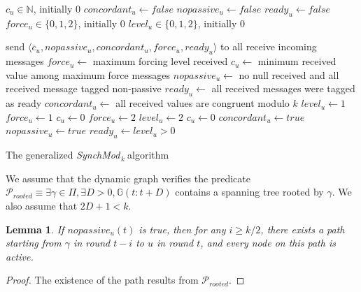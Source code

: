 \documentclass[11pt,letterpaper]{article}
\renewcommand{\geq}{\geqslant}
\newtheorem{lem}[thm]{Lemma}
\newcommand{\cent}{\gamma}
\newcommand{\SM}{{\em SynchMod}$_{\,k}\ $}
\begin{document}
\begin{algorithm}[htb]\label{algo:code}
\begin{distribalgo}[1]
\BLANK {}
	\STATE $c_u \in \mathds{N}$, initially 0
	\STATE $concordant_u \leftarrow false$
	\STATE $nopassive_u \leftarrow false$
	\STATE $ready_u \leftarrow false$
	\STATE $force_u \in \{0, 1, 2\}$, initially 0
	\STATE $level_u \in \{0, 1, 2\}$, initially 0

\ENDINDENT \BLANK

	\STATE send $\langle \overline{c}_u, nopassive_u, concordant_u, force_u, ready_u \rangle$ to all 
	\STATE receive incoming messages
	\STATE $force_u \leftarrow$ maximum forcing level received \label{line:force}
	\STATE $c_u \leftarrow$ minimum received value among maximum force messages \label{line:min-z-end}
	\STATE $nopassive_u \leftarrow$ no null received and all received message tagged non-passive
	\STATE $ready_u \leftarrow$ all received messages were tagged as ready
	\STATE $concordant_u \leftarrow$ all received values are congruent modulo $k$ \label{line:conc-gossip}
			\STATE $level_u \leftarrow 1$
			\STATE $force_u \leftarrow 1$ \label{line:force2}
			\STATE $c_u \leftarrow 0$
		\ENDIF
			\STATE $force_u \leftarrow 2$
			\STATE $level_u \leftarrow 2$
			\STATE $c_u \leftarrow 0$
		\ENDIF
		\STATE $concordant_u \leftarrow true$ \label{line:conc-true}
		\STATE $nopassive_u \leftarrow true$ \label{line:nopassive-true}
		\STATE $ready_u \leftarrow level_u > 0$ \label{line:init-ready}
	\ENDIF
\ENDINDENT 

\caption{The generalized \SM algorithm} \label{algo:R}
\end{distribalgo}

\end{algorithm}

We assume that the dynamic graph verifies the predicate $\mathcal{P}_{rooted} \equiv \exists \cent \in \Pi, \exists D > 0, \mathds{G}(t:t+D)$ contains a spanning tree rooted by $\cent$.
We also assume that $2D+1 < k$.

\begin{lem}
	If $nopassive_u(t)$ is true, then for any $i \geq k/2$, there exists a path starting from $\cent$ in round $t-i$ to $u$ in round $t$, and every node on this path is active.
\end{lem}
\begin{proof}
	The existence of the path results from $\mathcal{P}_{rooted}$. 
\end{proof}
\end{document}
